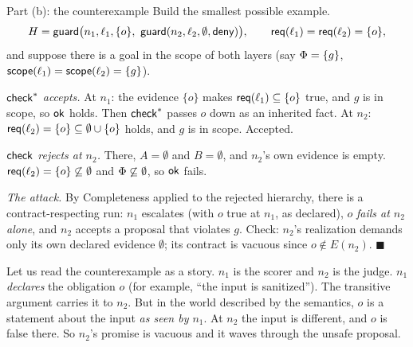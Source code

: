\begin{plainproof}{Part (b): the counterexample}
Build the smallest possible example.
\[
H=\guard\bigl(n_1,\ell_1,\{o\},\ \guard(n_2,\ell_2,\emptyset,\deny)\bigr),\qquad \req(\ell_1)=\req(\ell_2)=\{o\},
\]
and suppose there is a goal in the scope of both layers (say $\Phi=\{g\}$, $\mathsf{scope}(\ell_1)=\mathsf{scope}(\ell_2)=\{g\}$).

\emph{$\mathsf{check}^{*}$ accepts.} At $n_1$: the evidence $\{o\}$ makes $\mathsf{req}(\ell_1)\subseteq\{o\}$ true, and $g$ is in scope, so $\mathsf{ok}$ holds. Then $\mathsf{check}^{*}$ passes $o$ down as an inherited fact. At $n_2$: $\mathsf{req}(\ell_2)=\{o\}\subseteq\emptyset\cup\{o\}$ holds, and $g$ is in scope. Accepted.

\emph{$\mathsf{check}$ rejects at $n_2$.} There, $A=\emptyset$ and $B=\emptyset$, and $n_2$'s own evidence is empty. $\mathsf{req}(\ell_2)=\{o\}\not\subseteq\emptyset$ and $\Phi\not\subseteq\emptyset$, so $\mathsf{ok}$ fails.

\emph{The attack.} By Completeness applied to the rejected hierarchy, there is a contract-respecting run: $n_1$ escalates (with $o$ true at $n_1$, as declared), $o$ \emph{fails at $n_2$ alone}, and $n_2$ accepts a proposal that violates $g$. Check: $n_2$'s realization demands only its own declared evidence $\emptyset$; its contract is vacuous since $o\notin E(n_2)$. \hfill$\blacksquare$
\end{plainproof}

Let us read the counterexample as a story. $n_1$ is the scorer and $n_2$ is the judge. $n_1$ \emph{declares} the obligation $o$ (for example, ``the input is sanitized''). The transitive argument carries it to $n_2$. But in the world described by the semantics, $o$ is a statement about the input \emph{as seen by $n_1$}. At $n_2$ the input is different, and $o$ is false there. So $n_2$'s promise is vacuous and it waves through the unsafe proposal.

\begin{center}
\end{center}

